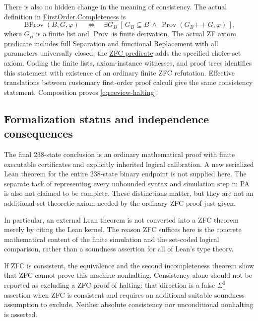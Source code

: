 There is also no hidden change in the meaning of consistency.
The actual definition in
\href{https://github.com/VladimirReshetnikov/ProveIt/blob/ce192939372ac7944fe2a0208c68a96d49fb5e3b/Logic/FirstOrder/Lean/FirstOrder/Completeness.lean}
{FirstOrder.Completeness} is
\[
 \operatorname{BProv}(B,G,\varphi)
 \quad\Longleftrightarrow\quad
 \exists G_B\;[\,G_B\subseteq B\ \land\
                   \operatorname{Prov}(G_B\mathbin{+\!+}G,\varphi)\,],
\]
where $G_B$ is a finite list and $\operatorname{Prov}$ is finite derivation.
The actual
\href{https://github.com/VladimirReshetnikov/ProveIt/blob/ce192939372ac7944fe2a0208c68a96d49fb5e3b/SetTheory/ZF/Lean/ZF/Zf.lean}
{ZF axiom predicate} includes full Separation and functional Replacement
with all parameters universally closed; the
\href{https://github.com/VladimirReshetnikov/ProveIt/blob/ce192939372ac7944fe2a0208c68a96d49fb5e3b/SetTheory/BoundedConsistency/Lean/BoundedZFCConsistency/Choice.lean}
{ZFC predicate} adds the specified choice-set axiom.  Coding the finite
lists, axiom-instance witnesses, and proof trees identifies this statement
with existence of an ordinary finite ZFC refutation.  Effective translations
between customary first-order proof calculi give the same consistency
statement.  Composition proves \eqref{eq:review-halting}.

\subsection{Formalization status and independence consequences}

The final 238-state conclusion is an ordinary mathematical proof with
finite executable certificates and explicitly inherited logical
calibration.  A new serialized Lean theorem for the entire 238-state
binary endpoint is not supplied here.  The separate task of representing
every unbounded syntax and simulation step in PA is also not claimed to
be complete.  These distinctions matter, but they are not an additional
set-theoretic axiom needed by the ordinary ZFC proof just given.

In particular, an external Lean theorem is not converted into a ZFC
theorem merely by citing the Lean kernel.  The reason ZFC suffices here
is the concrete mathematical content of the finite simulation and the
set-coded logical comparison, rather than a soundness assertion for all
of Lean's type theory.

If ZFC is consistent, the equivalence and the second incompleteness
theorem show that ZFC cannot prove this machine nonhalting.  Consistency
alone should not be reported as excluding a ZFC proof of halting: that
direction is a false $\Sigma^0_1$ assertion when ZFC is consistent and
requires an additional suitable soundness assumption to exclude.
Neither absolute consistency nor unconditional nonhalting is asserted.

